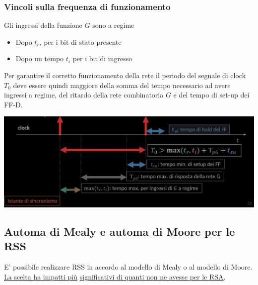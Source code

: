 \documentclass{article}
\begin{document}
\subsubsection{Vincoli sulla frequenza di funzionamento}
Gli ingressi della funzione $G$ sono a regime 
\begin{itemize}
    \item Dopo $t_r$, per i bit di stato presente
    \item Dopo un tempo $t_i$ per i bit di ingresso
\end{itemize}
Per garantire il corretto funzionamento della rete il periodo del segnale di clock $T_0$ deve essere quindi maggiore della somma del tempo necessario ad avere ingressi a regime, del ritardo della rete combinatoria $G$ e del tempo di set-up dei FF-D.
\begin{center}
    \includegraphics[scale=0.35]{frequenza-RSS.png}
\end{center}
\subsection{Automa di Mealy e automa di Moore per le RSS}
E’ possibile realizzare RSS in accordo al modello di Mealy o al modello di Moore. \underline{La scelta ha impatti più} \underline{significativi di quanti non ne avesse per le RSA}.
\end{document}

